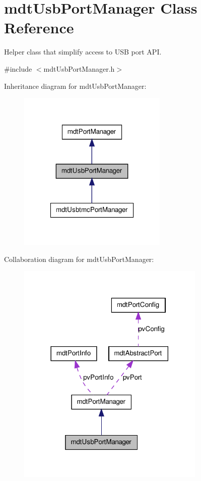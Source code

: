 \hypertarget{classmdt_usb_port_manager}{
\section{mdtUsbPortManager Class Reference}
\label{classmdt_usb_port_manager}
}


Helper class that simplify access to USB port API.  




{\ttfamily \#include $<$mdtUsbPortManager.h$>$}



Inheritance diagram for mdtUsbPortManager:\nopagebreak
\begin{figure}[H]
\begin{center}
\leavevmode
\includegraphics[width=202pt]{classmdt_usb_port_manager__inherit__graph}
\end{center}
\end{figure}


Collaboration diagram for mdtUsbPortManager:\nopagebreak
\begin{figure}[H]
\begin{center}
\leavevmode
\includegraphics[width=254pt]{classmdt_usb_port_manager__coll__graph}
\end{center}
\end{figure}
